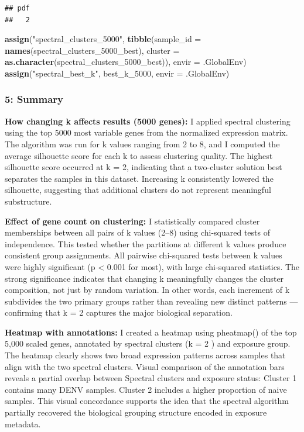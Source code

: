 \documentclass[
]{article}
\newenvironment{Shaded}{\begin{snugshade}}{\end{snugshade}}
\newcommand{\AttributeTok}[1]{\textcolor[rgb]{0.13,0.29,0.53}{#1}}
\newcommand{\FunctionTok}[1]{\textcolor[rgb]{0.13,0.29,0.53}{\textbf{#1}}}
\newcommand{\NormalTok}[1]{#1}
\newcommand{\StringTok}[1]{\textcolor[rgb]{0.31,0.60,0.02}{#1}}
\begin{document}
\begin{verbatim}
## pdf 
##   2
\end{verbatim}

\begin{Shaded}
\begin{Highlighting}[]
\FunctionTok{assign}\NormalTok{(}\StringTok{"spectral\_clusters\_5000"}\NormalTok{, }
       \FunctionTok{tibble}\NormalTok{(}\AttributeTok{sample\_id =} \FunctionTok{names}\NormalTok{(spectral\_clusters\_5000\_best), }
              \AttributeTok{cluster =} \FunctionTok{as.character}\NormalTok{(spectral\_clusters\_5000\_best)), }
       \AttributeTok{envir =}\NormalTok{ .GlobalEnv)}
\FunctionTok{assign}\NormalTok{(}\StringTok{"spectral\_best\_k"}\NormalTok{, best\_k\_5000, }\AttributeTok{envir =}\NormalTok{ .GlobalEnv)}
\end{Highlighting}
\end{Shaded}

\subsubsection{5: Summary}\label{summary}

\textbf{How changing k affects results (5000 genes):} I applied spectral
clustering using the top 5000 most variable genes from the normalized
expression matrix. The algorithm was run for k values ranging from 2 to
8, and I computed the average silhouette score for each k to assess
clustering quality. The highest silhouette score occurred at k = 2,
indicating that a two-cluster solution best separates the samples in
this dataset. Increasing k consistently lowered the silhouette,
suggesting that additional clusters do not represent meaningful
substructure.

\textbf{Effect of gene count on clustering:} I statistically compared
cluster memberships between all pairs of k values (2--8) using
chi-squared tests of independence. This tested whether the partitions at
different k values produce consistent group assignments. All pairwise
chi-squared tests between k values were highly significant (p
\textless{} 0.001 for most), with large chi-squared statistics. The
strong significance indicates that changing k meaningfully changes the
cluster composition, not just by random variation. In other words, each
increment of k subdivides the two primary groups rather than revealing
new distinct patterns --- confirming that k = 2 captures the major
biological separation.

\textbf{Heatmap with annotations:} I created a heatmap using pheatmap()
of the top 5,000 scaled genes, annotated by spectral clusters (k = 2 )
and exposure group. The heatmap clearly shows two broad expression
patterns across samples that align with the two spectral clusters.
Visual comparison of the annotation bars reveals a partial overlap
between Spectral clusters and exposure status: Cluster 1 contains many
DENV samples. Cluster 2 includes a higher proportion of naive samples.
This visual concordance supports the idea that the spectral algorithm
partially recovered the biological grouping structure encoded in
exposure metadata.
\end{document}
